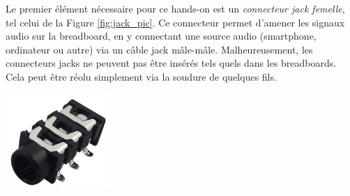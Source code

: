 
Le premier élément nécessaire pour ce hands-on est un \emph{connecteur jack femelle}, tel celui de la Figure \ref{fig:jack_pic}. Ce connecteur permet d'amener les signaux audio sur la breadboard, en y connectant une source audio (smartphone, ordinateur ou autre) via un câble jack mâle-mâle. Malheureusement, les connecteurs jacks ne peuvent pas être insérés tels quels dans les breadboards. Cela peut être réolu simplement via la soudure de quelques fils.\\

\begin{minipage}[c]{\textwidth}
	\centering
	\includegraphics[width=0.3\textwidth]{figures/jack.jpg}
	\label{fig:jack_pic}
\end{minipage}
\vspace{1cm}